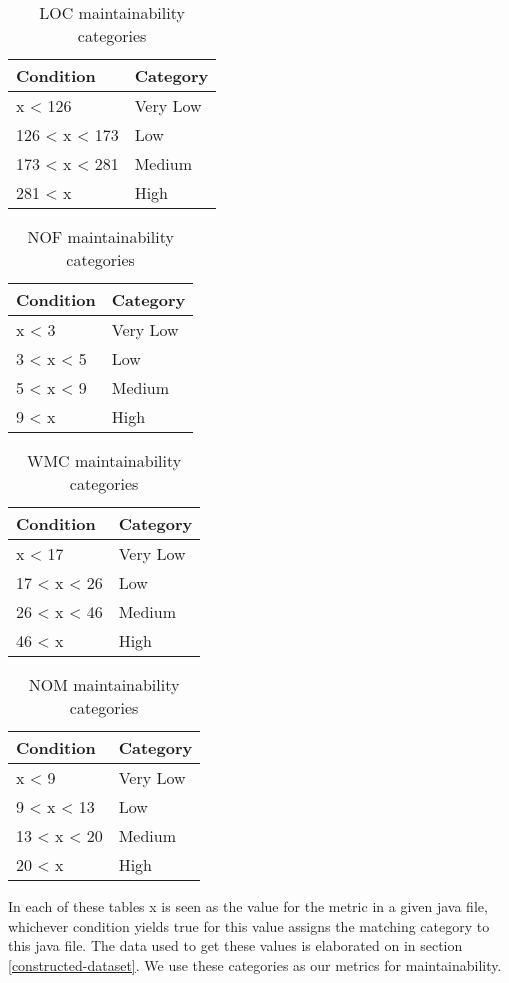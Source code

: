 \begin{table}[h!]
    \centering
    \label{categories-LOC}
    \begin{tabular}{|l|l|}
        \hline
        \textbf{Condition} & \textbf{Category} \\
        \hline
        x < 126 & Very Low \\
        126 < x < 173 & Low \\
        173 < x < 281 & Medium \\
        281 < x & High \\
        \hline
    \end{tabular}
    \caption{LOC maintainability categories}
\end{table}
\begin{table}[h!]
    \centering
    \label{categories-NOF}
    \begin{tabular}{|l|l|}
        \hline
        \textbf{Condition} & \textbf{Category} \\
        \hline
        x < 3 & Very Low \\
        3 < x < 5 & Low \\
        5 < x < 9 & Medium \\
        9 < x & High \\
        \hline
    \end{tabular}
    \caption{NOF maintainability categories}
\end{table}
\begin{table}[h!]
    \centering
    \label{categories-WMC}
    \begin{tabular}{|l|l|}
        \hline
        \textbf{Condition} & \textbf{Category} \\
        \hline
        x < 17 & Very Low \\
        17 < x < 26 & Low \\
        26 < x < 46 & Medium \\
        46 < x & High \\
        \hline
    \end{tabular}
    \caption{WMC maintainability categories}
\end{table}
\begin{table}[h!]
    \centering
    \label{categories-NOM}
    \begin{tabular}{|l|l|}
        \hline
        \textbf{Condition} & \textbf{Category} \\
        \hline
        x < 9 & Very Low \\
        9 < x < 13 & Low \\
        13 < x < 20 & Medium \\
        20 < x & High \\
        \hline
    \end{tabular}
    \caption{NOM maintainability categories}
\end{table}
In each of these tables x is seen as the value for the metric in a given java file, whichever condition yields true for this value assigns the matching category to this java file. The data used to get these values is elaborated on in section \ref{constructed-dataset}. We use these categories as our metrics for maintainability.

